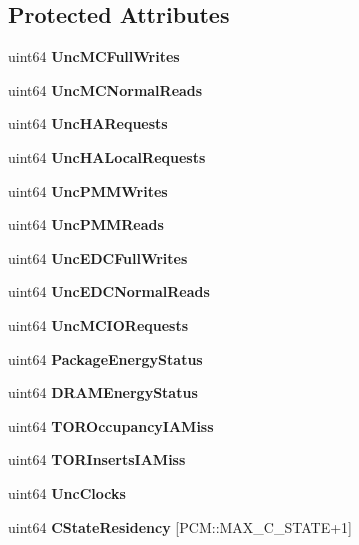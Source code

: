 \subsection*{Protected Attributes}
\begin{DoxyCompactItemize}
\item 
\mbox{\label{classUncoreCounterState_a3e59bb4c79f6040b17b104194a5e29fb}} 
uint64 {\bfseries Unc\+M\+C\+Full\+Writes}
\item 
\mbox{\label{classUncoreCounterState_a5a07c23a907365682137c5d8c1cf79ad}} 
uint64 {\bfseries Unc\+M\+C\+Normal\+Reads}
\item 
\mbox{\label{classUncoreCounterState_a4c071ed0d5723d569beb45621d9edce7}} 
uint64 {\bfseries Unc\+H\+A\+Requests}
\item 
\mbox{\label{classUncoreCounterState_a1aabe7c77c2e15e1bca73e5edca5b2a4}} 
uint64 {\bfseries Unc\+H\+A\+Local\+Requests}
\item 
\mbox{\label{classUncoreCounterState_a0d40d02f2641ca78aea31e1baf44b449}} 
uint64 {\bfseries Unc\+P\+M\+M\+Writes}
\item 
\mbox{\label{classUncoreCounterState_aa47838582cf16e069c86d09f51385718}} 
uint64 {\bfseries Unc\+P\+M\+M\+Reads}
\item 
\mbox{\label{classUncoreCounterState_a933afbcf1236a619c7459e84b55b0528}} 
uint64 {\bfseries Unc\+E\+D\+C\+Full\+Writes}
\item 
\mbox{\label{classUncoreCounterState_ac5a6269e7564fd952331a78e2cb47adb}} 
uint64 {\bfseries Unc\+E\+D\+C\+Normal\+Reads}
\item 
\mbox{\label{classUncoreCounterState_a4c3d0db74283d9420d9089e2c2553561}} 
uint64 {\bfseries Unc\+M\+C\+I\+O\+Requests}
\item 
\mbox{\label{classUncoreCounterState_a74bdee47e68bbc55c2ee023fc3bfe76d}} 
uint64 {\bfseries Package\+Energy\+Status}
\item 
\mbox{\label{classUncoreCounterState_a03c78bbb9fb36c84c075b8d72fc5eed9}} 
uint64 {\bfseries D\+R\+A\+M\+Energy\+Status}
\item 
\mbox{\label{classUncoreCounterState_ad9c072ee0fdc984b82d0c143a186ce37}} 
uint64 {\bfseries T\+O\+R\+Occupancy\+I\+A\+Miss}
\item 
\mbox{\label{classUncoreCounterState_a92b8e5a10e1b634824a6a17049a777bd}} 
uint64 {\bfseries T\+O\+R\+Inserts\+I\+A\+Miss}
\item 
\mbox{\label{classUncoreCounterState_a515a8614f806f057d4a092a9f4a5c473}} 
uint64 {\bfseries Unc\+Clocks}
\item 
\mbox{\label{classUncoreCounterState_a5819f82036b4386ca638d0755cdc7388}} 
uint64 {\bfseries C\+State\+Residency} [P\+C\+M\+::\+M\+A\+X\+\_\+\+C\+\_\+\+S\+T\+A\+TE+1]
\end{DoxyCompactItemize}
